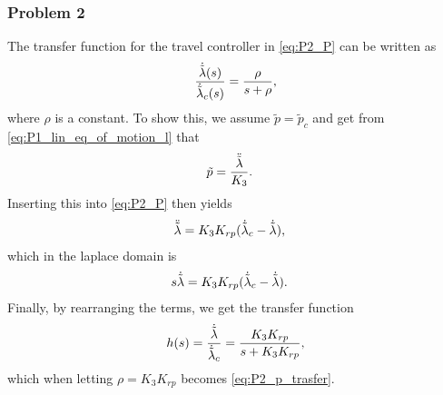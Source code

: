 \subsubsection{Problem 2}
The transfer function for the travel controller in \eqref{eq:P2_P} can be written as
\begin{equation}
    \frac{\dot{\tilde{\lambda}}(s)}{\dot{\tilde{\lambda}}_c(s)} = \frac{\rho}{s + \rho}, 
    \label{eq:P2_p_trasfer}
\end{equation}
where $\rho$ is a constant. To show this, we assume $\tilde p = \tilde p_c$ and get from \eqref{eq:P1_lin_eq_of_motion_l} that
\begin{align}
    \tilde{p} &= \frac{\ddot{\tilde{\lambda}}}{K_3} \label{eq:P2_p_to_lambda}.
\end{align}
Inserting this into \eqref{eq:P2_P} then yields
\begin{align*}
    \ddot{\tilde{\lambda}} &= K_3 K_{rp} (\dot{\tilde{\lambda}}_c - \dot{\tilde{\lambda}}),
\end{align*}
which in the laplace domain is
\begin{align*}
    s\dot{\tilde{\lambda}} &= K_3 K_{rp} (\dot{\tilde{\lambda}}_c - \dot{\tilde{\lambda}}).
\end{align*}
Finally, by rearranging the terms, we get the transfer function 
\begin{align}
    h(s) = \frac{\dot{\tilde{\lambda}}}{\dot{\tilde{\lambda}}_c} = \frac{K_3 K_{rp}}{s + K_3 K_{rp}},
\end{align}
which when letting $\rho = K_3 K_{rp}$ becomes \eqref{eq:P2_p_trasfer}.
